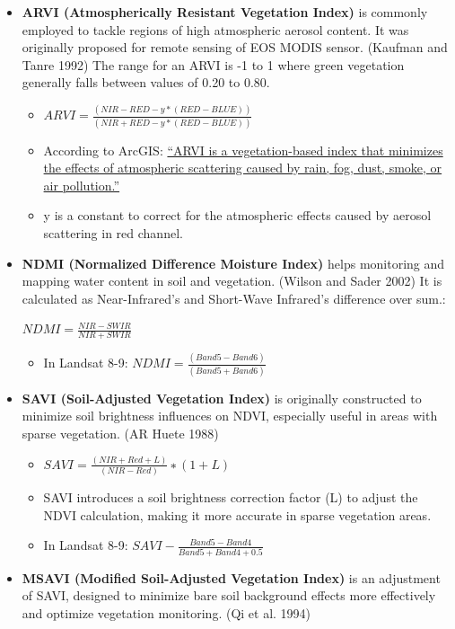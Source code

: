 \documentclass[
  letterpaper,
  DIV=11,
  numbers=noendperiod]{scrreprt}
\providecommand{\tightlist}{%
  \setlength{\itemsep}{0pt}\setlength{\parskip}{0pt}}\usepackage{longtable,booktabs,array}
\begin{document}
\begin{itemize}
\item
  \textbf{ARVI (Atmospherically Resistant Vegetation Index)} is commonly
  employed to tackle regions of high atmospheric aerosol content. It was
  originally proposed for remote sensing of EOS MODIS sensor. (Kaufman
  and Tanre 1992) The range for an ARVI is -1 to 1 where green
  vegetation generally falls between values of 0.20 to 0.80.

  \begin{itemize}
  \item
    \(ARVI = \frac{(NIR - RED - y * (RED - BLUE))}{(NIR + RED - y*(RED-BLUE))}\)
  \item
    According to ArcGIS:
    \href{https://www.arcgis.com/home/item.html?id=56a6db4cdd1c46988a1411d0365fd5f7}{``ARVI
    is a vegetation-based index that minimizes the effects of
    atmospheric scattering caused by rain, fog, dust, smoke, or air
    pollution.''}
  \item
    y is a constant to correct for the atmospheric effects caused by
    aerosol scattering in red channel.
  \end{itemize}
\item
  \textbf{NDMI (Normalized Difference Moisture Index)} helps monitoring
  and mapping water content in soil and vegetation. (Wilson and Sader
  2002) It is calculated as Near-Infrared's and Short-Wave Infrared's
  difference over sum.:

  \(NDMI = \frac{NIR - SWIR}{NIR + SWIR}\)

  \begin{itemize}
  \tightlist
  \item
    In Landsat 8-9: \(NDMI =\frac{(Band5 - Band6)}{(Band5+Band6)}​\)
  \end{itemize}
\item
  \textbf{SAVI (Soil-Adjusted Vegetation Index)} is originally
  constructed to minimize soil brightness influences on NDVI, especially
  useful in areas with sparse vegetation. (AR Huete 1988)

  \begin{itemize}
  \item
    \(SAVI =\frac{(NIR+Red+L)}{(NIR−Red)}​∗(1+L)\)
  \item
    SAVI introduces a soil brightness correction factor (L) to adjust
    the NDVI calculation, making it more accurate in sparse vegetation
    areas.
  \item
    In Landsat 8-9: \(SAVI - \frac{Band5 - Band4}{Band5 + Band4 +0.5}\)
  \end{itemize}
\item
  \textbf{MSAVI (Modified Soil-Adjusted Vegetation Index)} is an
  adjustment of SAVI, designed to minimize bare soil background effects
  more effectively and optimize vegetation monitoring. (Qi et al. 1994)


\end{itemize}
\end{document}
